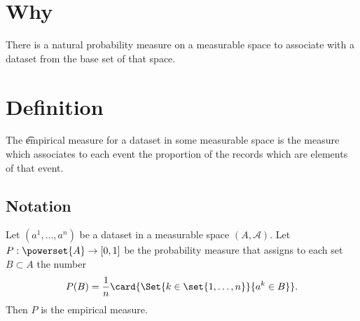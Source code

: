 

\section*{Why}

There is a natural probability measure on a measurable space to associate with a dataset from the base set of that space.

\section*{Definition}

The \t{empirical measure} for a dataset in some measurable space is the measure which associates to each event the proportion of the records which are elements of that event.

\subsection*{Notation}

Let $(a^1, \dots , a^n)$ be a dataset in a measurable space $(A, \mathcal{A} )$.
Let $P: \powerset{A} \to [0, 1]$ be the probability measure that assigns to each set $B \subset A$ the number
$$
P(B) = \frac{1}{n} \card{\Set{k \in \set{1, \dots , n}}{a^k \in B}}.
$$
Then $P$ is the empirical measure.

\blankpage